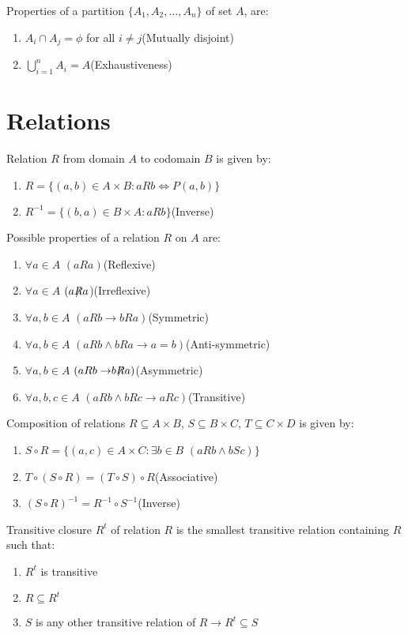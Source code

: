 \documentclass[12pt, a4paper]{article}
\begin{document}
\begin{multicols*}{3}
Properties of a partition $\{A_1, A_2, \ldots, A_n\}$ of set $A$, are:
\begin{enumerate}[\roman*.]
  \item $A_i \cap A_j = \phi$ for all $i \neq j$\hfill(Mutually disjoint)
  \item \(\displaystyle \bigcup_{i=1}^n A_i = A\)\hfill(Exhaustiveness)
\end{enumerate}
\colbreak
\section{Relations}
Relation $R$ from domain $A$ to codomain $B$ is given by:
\begin{enumerate}[\roman*.]
  \item $R = \{(a, b) \in A \times B : aRb \iff P(a, b)\}$
  \item $R^{-1} = \{(b, a) \in B \times A : aRb\}$\hfill(Inverse)
\end{enumerate}

Possible properties of a relation $R$ on $A$ are:
\begin{enumerate}[\roman*.]
  \item $\forall a \in A$ $(aRa)$\hfill(Reflexive)
  \item $\forall a \in A$ $(\mathrel{a}\not\mathrel{R}\mathrel{a}$)\hfill(Irreflexive)
  \item $\forall a,b \in A$ $(aRb \rightarrow bRa)$\hfill(Symmetric)
  \item $\forall a,b \in A$ $(aRb \land bRa \rightarrow a=b)$\hfill(Anti-symmetric)
  \item $\forall a,b \in A$ $(aRb \rightarrow \mathrel{b}\not\mathrel{R}\mathrel{a})$\hfill(Asymmetric)
  \item $\forall a,b,c \in A$ $(aRb \land bRc \rightarrow aRc)$\hfill(Transitive)
\end{enumerate}

Composition of relations $R \subseteq A \times B$, $S \subseteq B \times C$, $T \subseteq C \times D$ is given by:
\begin{enumerate}[\roman*.]
  \item $S \circ R = \{(a, c) \in A \times C : \exists b \in B$ $(aRb \land bSc)\}$
  \item $T \circ (S \circ R) = (T \circ S) \circ R$\hfill(Associative)
  \item $(S \circ R)^{-1} = R^{-1}\circ S^{-1}$\hfill(Inverse)
\end{enumerate}

Transitive closure $R^t$ of relation $R$ is the smallest transitive relation containing $R$ such that:
\begin{enumerate}[\roman*.]
  \item $R^t$ is transitive
  \item $R \subseteq R^t$
  \item $S$ is any other transitive relation of $R \rightarrow R^t \subseteq S$
\end{enumerate}


\end{multicols*}
\end{document}
